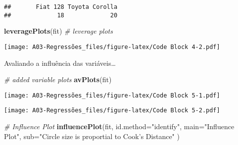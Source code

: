 \documentclass[]{article}
\newenvironment{Shaded}{\begin{snugshade}}{\end{snugshade}}
\newcommand{\CommentTok}[1]{\textcolor[rgb]{0.56,0.35,0.01}{\textit{#1}}}
\newcommand{\DataTypeTok}[1]{\textcolor[rgb]{0.13,0.29,0.53}{#1}}
\newcommand{\DecValTok}[1]{\textcolor[rgb]{0.00,0.00,0.81}{#1}}
\newcommand{\KeywordTok}[1]{\textcolor[rgb]{0.13,0.29,0.53}{\textbf{#1}}}
\newcommand{\NormalTok}[1]{#1}
\newcommand{\OperatorTok}[1]{\textcolor[rgb]{0.81,0.36,0.00}{\textbf{#1}}}
\newcommand{\StringTok}[1]{\textcolor[rgb]{0.31,0.60,0.02}{#1}}
\begin{document}
\begin{verbatim}
##       Fiat 128 Toyota Corolla 
##             18             20
\end{verbatim}

\begin{Shaded}
\begin{Highlighting}[]
\KeywordTok{leveragePlots}\NormalTok{(fit) }\CommentTok{# leverage plots}
\end{Highlighting}
\end{Shaded}

\texttt{[image: A03-Regressões\_files/figure-latex/Code Block 4-2.pdf]}

Avaliando a influência das variáveis\ldots{}

\begin{Shaded}
\begin{Highlighting}[]
\CommentTok{# added variable plots }
\KeywordTok{avPlots}\NormalTok{(fit)}
\end{Highlighting}
\end{Shaded}

\texttt{[image: A03-Regressões\_files/figure-latex/Code Block 5-1.pdf]}

\begin{Shaded}
\end{Shaded}

\texttt{[image: A03-Regressões\_files/figure-latex/Code Block 5-2.pdf]}

\begin{Shaded}
\begin{Highlighting}[]
\CommentTok{# Influence Plot }
\KeywordTok{influencePlot}\NormalTok{(fit, }\DataTypeTok{id.method=}\StringTok{"identify"}\NormalTok{, }\DataTypeTok{main=}\StringTok{"Influence Plot"}\NormalTok{, }\DataTypeTok{sub=}\StringTok{"Circle size is proportial to Cook's Distance"}\NormalTok{ )}
\end{Highlighting}
\end{Shaded}
\end{document}
